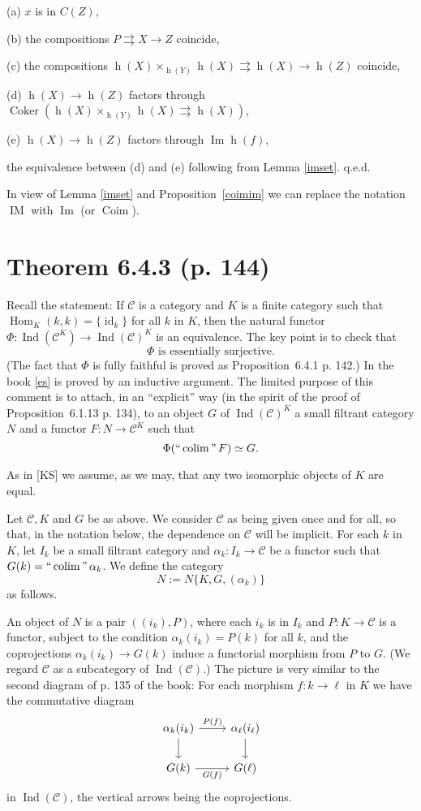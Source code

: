 \documentclass[12pt]{article}
\newcommand{\n}{\noindent}
\newcommand{\C}{\mathcal C}
\newcommand{\pa}{\rightrightarrows}
\newcommand{\be}{\begin{equation}}
\newcommand{\ee}{\end{equation}}
\newcommand{\pr}{Proposition}
\DeclareMathOperator*{\coli}{colim}
\DeclareMathOperator*{\ic}{``\coli"}
\DeclareMathOperator{\Coim}{Coim}
\DeclareMathOperator{\Coker}{Coker}
\DeclareMathOperator{\Ima}{Im}
\DeclareMathOperator{\IM}{IM}
\DeclareMathOperator{\hy}{h}
\DeclareMathOperator{\id}{id}
\DeclareMathOperator{\h}{Hom}
\DeclareMathOperator{\Ind}{Ind}
\begin{document}
(a) $x$ is in $C(Z)$, 

(b) the compositions $P\pa X\to Z$ coincide, 

(c) the compositions $\hy(X)\times_{\hy(Y)}\hy(X)\pa\hy(X)\to\hy(Z)$ coincide, 

(d) $\hy(X)\to\hy(Z)$ factors through $\Coker(\hy(X)\times_{\hy(Y)}\hy(X)\pa\hy(X))$, 

(e) $\hy(X)\to\hy(Z)$ factors through $\Ima\hy(f)$, 

\n the equivalence between (d) and (e) following from Lemma \ref{imset}. q.e.d. 

In view of Lemma \ref{imset} and \pr\ \ref{coimim} we can replace the notation $\IM$ with $\Ima$ (or $\Coim$). 
% 
\section{Theorem 6.4.3 (p. 144)}%
% 
Recall the statement: If $\C$ is a category and $K$ is a finite category such that $\h_K(k,k)=\{\id_k\}$ for all $k$ in $K$, then the natural functor $\Phi:\Ind(\C^K)\to\Ind(\C)^K$ is an equivalence. The key point is to check that 
%
\be\label{es} 
\Phi\text{ is essentially surjective.} 
\ee 
%
(The fact that $\Phi$ is fully faithful is proved as \pr\ 6.4.1 p. 142.) In the book \eqref{es} is proved by an inductive argument. The limited purpose of this comment is to attach, in an ``explicit'' way (in the spirit of the proof of \pr\ 6.1.13 p. 134), to an object $G$ of $\Ind(\C)^K$ a small filtrant category $N$ and a functor $F:N\to\C^K$ such that 
$$ 
\Phi(\ic F)\simeq G. 
$$ 

As in [KS] we assume, as we may, that any two isomorphic objects of $K$ are equal. 

Let $\C,K$ and $G$ be as above. We consider $\C$ as being given once and for all, so that, in the notation below, the dependence on $\C$ will be implicit. For each $k$ in $K$, let $I_k$ be a small filtrant category and $\alpha_k:I_k\to\C$ be a functor such that $G(k)=\ic\alpha_k$. We define the category 
$$
N:=N\{K,G,(\alpha_k)\}
$$ 
as follows. 

An object of $N$ is a pair $((i_k),P)$, where each $i_k$ is in $I_k$ and $P:K\to\C$ is a functor, subject to the condition $\alpha_k(i_k)=P(k)$ for all $k$, and the coprojections $\alpha_k(i_k)\to G(k)$ induce a functorial morphism from $P$ to $G$. (We regard $\C$ as a subcategory of $\Ind(\C)$.) The picture is very similar to the second diagram of p. 135 of the book: For each morphism $f:k\to\ell$ in $K$ we have the commutative diagram 
$$ 
\begin{tikzcd} 
\alpha_k(i_k)\ar{r}{P(f)}\ar{d}&\alpha_\ell(i_\ell)\ar{d}\\ 
G(k)\ar{r}[swap]{G(f)}&G(\ell) 
\end{tikzcd} 
$$ 
in $\Ind(\C)$, the vertical arrows being the coprojections. 
\end{document}
